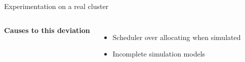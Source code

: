 \documentclass[12pt, aspectratio=43]{beamer}
\begin{document}
\begin{frame}{Experimentation on a real cluster}
\begin{columns}
		\vspace{1ex}








		\textbf{Causes to this deviation}
		\begin{itemize}
			\item Scheduler over allocating when simulated
			\item Incomplete simulation models
		\end{itemize}
	\end{columns}
\end{frame}
\end{document}
